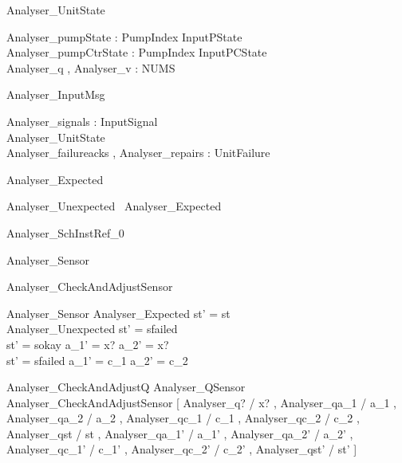 \documentclass{article}
\begin{document}
\begin{schema}{Analyser\_UnitState}

 Analyser\_pumpState : PumpIndex \fun InputPState \\
 Analyser\_pumpCtrState : PumpIndex \fun InputPCState \\
 Analyser\_q , Analyser\_v : NUMS
\end{schema}

\begin{schema}{Analyser\_InputMsg}

 Analyser\_signals : \power InputSignal \\
 Analyser\_UnitState \\
 Analyser\_failureacks , Analyser\_repairs : \power UnitFailure
\end{schema}

\begin{zed}
	Analyser\_Expected 
\end{zed}

\begin{zed}
	Analyser\_Unexpected ~\lnot Analyser\_Expected
\end{zed}

\begin{zed}
	Analyser\_SchInstRef\_0 
\end{zed}

\begin{zed}
	Analyser\_Sensor 
\end{zed}

\begin{schema}{Analyser\_CheckAndAdjustSensor}

 Analyser\_Sensor 
\where
 Analyser\_Expected \implies st' = st \\
 Analyser\_Unexpected \implies st' = sfailed \\
 st' = sokay \implies a\_1' = x? \land a\_2' = x? \\
 st' = sfailed \implies a\_1' = c\_1 \land a\_2' = c\_2
\end{schema}

\begin{zed}
	Analyser\_CheckAndAdjustQ  Analyser\_QSensor \land Analyser\_CheckAndAdjustSensor [ Analyser\_q? / x? , Analyser\_qa\_1 / a\_1 , Analyser\_qa\_2 / a\_2 , Analyser\_qc\_1 / c\_1 , Analyser\_qc\_2 / c\_2 , Analyser\_qst / st , Analyser\_qa\_1' / a\_1' , Analyser\_qa\_2' / a\_2' , Analyser\_qc\_1' / c\_1' , Analyser\_qc\_2' / c\_2' , Analyser\_qst' / st' ]
\end{zed}
\end{document}
